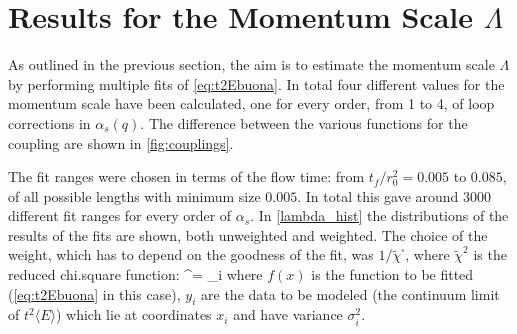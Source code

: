 \section{Results for the Momentum Scale $\Lambda$} 
As outlined in the previous section, the aim is to estimate the momentum scale $\Lambda$ by performing multiple fits of \cref{eq:t2Ebuona}. In total four different values for the momentum scale have been calculated, one for every order, from 1 to 4, of loop corrections in $\alpha_s(q)$. The difference between the various functions for the coupling are shown in \cref{fig:couplings}. 


The fit ranges were chosen in terms of the flow time: from $t_f/r_0^2 = 0.005$ to $0.085$, of all possible lengths with minimum size $0.005$. In total this gave around 3000 different fit ranges for every order of $\alpha_s$. In \cref{lambda_hist} the distributions of the results of the fits are shown, both unweighted and weighted. The choice of the weight, which has to depend on the goodness of the fit, was $1/\tilde\chi^\square$, where $\tilde\chi^2$ is the reduced chi.square function:
\beq
\tilde\chi^\square =  \sum_i
\eeq
where $f(x)$ is the function to be fitted (\cref{eq:t2Ebuona} in this case), $y_i$ are the data to be modeled (the continuum limit of $t^2\langle E\rangle$) which lie at coordinates $x_i$ and have variance $\sigma_i^2$. 


